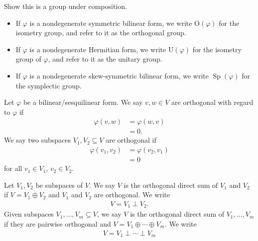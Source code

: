 \documentclass[10pt]{mypackage}
\begin{document}
  \begin{exercise}
    Show this is a group under composition.
  \end{exercise}
  \begin{example}\hfill
    \begin{itemize}
      \item If $\varphi$ is a nondegenerate symmetric bilinear form, we write $\text{O}(\varphi)$ for the isometry group, and refer to it as the orthogonal group.
      \item If $\varphi$ is a nondegenerate Hermitian form, we write $\text{U}\left(\varphi\right)$ for the isometry group of $\varphi$, and refer to it as the unitary group.
      \item If $\varphi$ is a nondegenerate skew-symmetric bilinear form, we write $\operatorname{Sp}\left(\varphi\right)$ for the symplectic group.
    \end{itemize}
  \end{example}
  \begin{definition}
    Let $\varphi$ be a bilinear/sesquilinear form. We say $v,w\in V$ are orthogonal with regard to $\varphi$ if
    \begin{align*}
      \varphi\left(v,w\right) &= \varphi\left(w,v\right)\\
                              &= 0.
    \end{align*}
    We say two subspaces $V_1,V_2\subseteq V$ are orthogonal if
    \begin{align*}
      \varphi\left(v_1,v_2\right) &= \varphi\left(v_2,v_1\right)\\
                                  &= 0
    \end{align*}
    for all $v_1\in V_1$, $v_2\in V_2$.
  \end{definition}
  \begin{definition}
    Let $V_1,V_2$ be subspaces of $V$. We say $V$ is the orthogonal direct sum of $V_1$ and $V_2$ if $V = V_1 \oplus V_2$ and $V_1$ and $V_2$ are orthogonal. We write
    \begin{align*}
      V = V_1\perp V_2.
    \end{align*}
    Given subspaces $V_1,\dots,V_m\subseteq V$, we say $V$ is the orthogonal direct sum of $V_1,\dots,V_m$ if they are pairwise orthogonal and $V = V_1\oplus\cdots\oplus V_m$. We write
    \begin{align*}
      V = V_1\perp\cdots\perp V_m
    \end{align*}
    
  \end{definition}
\end{document}
